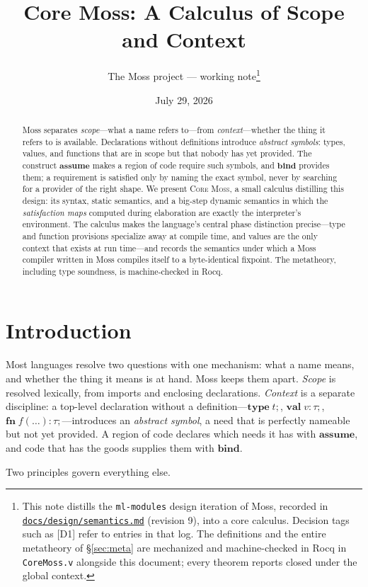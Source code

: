 \documentclass[10pt]{article}
\title{\textbf{Core Moss: A Calculus of Scope and Context}}
\author{The Moss project --- working note\thanks{This note distills the
\texttt{ml-modules} design iteration of Moss, recorded in
\href{https://github.com/moss-lang/moss/blob/ml-modules/docs/design/semantics.md}{\texttt{docs/design/semantics.md}}
(revision 9), into a core calculus.
Decision tags such as [D1] refer to entries in that log. The definitions
and the entire metatheory of \S\ref{sec:meta} are mechanized and
machine-checked in Rocq in \texttt{CoreMoss.v} alongside this document;
every theorem reports closed under the global context.}}
\date{July 29, 2026}
\newcommand{\kw}[1]{\mathbf{#1}}          %
\theoremstyle{plain}
\theoremstyle{remark}
\begin{document}
\maketitle

\begin{abstract}
Moss separates \emph{scope}---what a name refers to---from
\emph{context}---whether the thing it refers to is available.
Declarations without definitions introduce \emph{abstract symbols}: types,
values, and functions that are in scope but that nobody has yet provided.
The construct $\kw{assume}$ makes a region of code require such symbols,
and $\kw{bind}$ provides them; a requirement is satisfied only by naming
the exact symbol, never by searching for a provider of the right shape.
We present \textsc{Core Moss}, a small calculus distilling this design:
its syntax, static semantics, and a big-step dynamic semantics in which
the \emph{satisfaction maps} computed during elaboration are exactly the
interpreter's environment. The calculus makes the language's central
phase distinction precise---type and function provisions specialize away
at compile time, and values are the only context that exists at run
time---and records the semantics under which a Moss compiler written in
Moss compiles itself to a byte-identical fixpoint. The metatheory,
including type soundness, is machine-checked in Rocq.
\end{abstract}

\section{Introduction}\label{sec:intro}

Most languages resolve two questions with one mechanism: what a name
means, and whether the thing it means is at hand. Moss keeps them apart.
\emph{Scope} is resolved lexically, from imports and enclosing
declarations. \emph{Context} is a separate discipline: a top-level
declaration without a definition---$\kw{type}\;t;$, $\kw{val}\;v:\tau;$,
$\kw{fn}\;f(\ldots):\tau;$---introduces an \emph{abstract symbol}, a need
that is perfectly nameable but not yet provided. A region of code
declares which needs it has with $\kw{assume}$, and code that has the
goods supplies them with $\kw{bind}$.

Two principles govern everything else.
\end{document}
